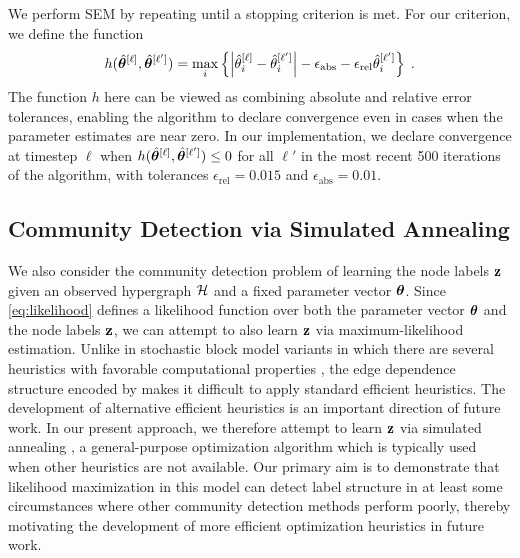 \documentclass[aps,pre,reprint,superscriptaddress,nofootinbib]{revtex4-2}
\begin{document}
    We perform SEM by repeating  until a stopping criterion is met. 
    For our criterion, we define the function 
    \begin{align*}
        h(\hat{\boldsymbol{\theta}}^{[\ell]}, \hat{\boldsymbol{\theta}}^{[\ell']}) = \max_{i} \left\{\left| \hat{\theta}_i^{[\ell]} - \hat{\theta}_i^{[\ell']} \right| - \epsilon_\mathrm{abs} - \epsilon_\mathrm{rel} \hat{\theta}_i^{[\ell']}\right\} \;.
    \end{align*}
    The function $h$ here can be viewed as combining absolute and relative error tolerances, enabling the algorithm to declare convergence even in cases when the parameter estimates are near zero. 
    In our implementation, we declare convergence at timestep $\ell$ when $h(\hat{\boldsymbol{\theta}}^{[\ell]}, \hat{\boldsymbol{\theta}}^{[\ell']}) \leq 0$ for all $\ell'$ in the most recent 500 iterations of the algorithm, with tolerances $\epsilon_\mathrm{rel} = 0.015$ and $\epsilon_\mathrm{abs} = 0.01$.

\subsection{Community Detection via Simulated Annealing} \label{sec:community-detection}

    We also consider the community detection problem of learning the node labels $\mathbf{z}$ given an observed hypergraph $\mathcal{H}$ and a fixed parameter vector $\boldsymbol{\theta}$.
    Since \cref{eq:likelihood} defines a likelihood function over both the parameter vector $\boldsymbol{\theta}$ and the node labels $\mathbf{z}$, we can attempt to also learn $\mathbf{z}$ via maximum-likelihood estimation.
    Unlike in stochastic block model variants in which there are several heuristics with favorable computational properties \cite{newman2016equivalence,chodrowGenerativeHypergraphClustering2021,chodrowNonbacktrackingSpectralClustering2023,ruggeriCommunityDetectionLarge2023,kritschgauCommunityDetectionHypergraphs2024,hood2026broad,li2026higher}, the edge dependence structure encoded by \model{} makes it difficult to apply standard efficient heuristics.
    The development of alternative efficient heuristics is an important direction of future work. 
    In our present approach, we therefore attempt to learn $\mathbf{z}$ via simulated annealing \cite{kirkpatrickOptimizationSimulatedAnnealing1983},  a general-purpose optimization algorithm which is typically used when other heuristics are not available. 
    Our primary aim is to demonstrate that likelihood maximization in this model can detect label structure in at least some circumstances where other community detection methods perform poorly, thereby motivating the development of more efficient optimization heuristics in future work. 
    
\end{document}
